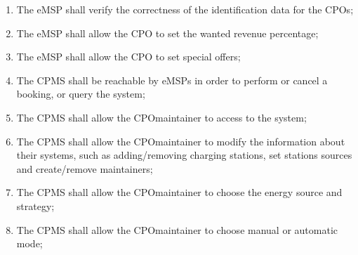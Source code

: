 \begin{enumerate}[label=\textbf{R\arabic*}]
    \item The \ac{eMSP} shall verify the correctness of the identification data for the \acp{CPO};\label{req:eMSP-correct-cpo-info}
    \item The \ac{eMSP} shall allow the \ac{CPO} to set the wanted revenue percentage;\label{req:eMSP-set-revenue}
    \item The \ac{eMSP} shall allow the \ac{CPO} to set special offers;\label{req:eMSP-set-special-offers}
    \item The \ac{CPMS} shall be reachable by \acp{eMSP} in order to perform or cancel a booking, or query the system;\label{req:CPMS-reachable}
    \item The \ac{CPMS} shall allow the \ac{CPO}maintainer to access to the system;\label{req:CPMS-accessible}
    \item The \ac{CPMS} shall allow the \ac{CPO}maintainer to modify the information about their systems, such as adding/removing charging stations, set stations sources and create/remove maintainers;\label{req:CPMS-modify-cpo-infos}
    \item The \ac{CPMS} shall allow the \ac{CPO}maintainer to choose the energy source and strategy;\label{req:CPMS-select-source-strategy}
    \item The \ac{CPMS} shall allow the \ac{CPO}maintainer to choose manual or automatic mode;\label{req:CPMS-select-mode}
\end{enumerate}

